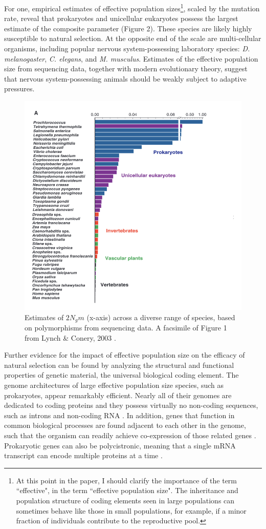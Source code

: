 \documentclass{article}
\begin{document}
For one, empirical estimates of effective population sizes\footnote{At this point in the paper, I should clarify the importance of the term ``effective", in the term ``effective population size". The inheritance and population structure of coding elements seen in large populations can sometimes behave like those in small populations, for example, if a minor fraction of individuals contribute to the reproductive pool.}, scaled by the mutation rate, reveal that prokaryotes and unicellular eukaryotes possess the largest estimate of the composite parameter (Figure 2). These species are likely highly susceptible to natural selection. At the opposite end of the scale are multi-cellular organisms, including popular nervous system-possessing laboratory species: \textit{D. melanogaster}, \textit{C. elegans}, and \textit{M. musculus}. Estimates of the effective population size from sequencing data, together with modern evolutionary theory, suggest that nervous system-possessing animals should be weakly subject to adaptive pressures. 

\begin{figure}[htp]
\centering
\includegraphics[width=10 cm]{fig_2.jpeg}
\caption{Estimates of $2N_g m$ (x-axis) across a diverse range of species, based on polymorphisms from sequencing data. A facsimile of Figure 1 from Lynch \& Conery, 2003 \cite{Lynch_Conery_2003}.}
\end{figure}

Further evidence for the impact of effective population size on the efficacy of natural selection can be found by analyzing the structural and functional properties of genetic material, the universal biological coding element. The genome architectures of large effective population size species, such as prokaryotes, appear remarkably efficient. Nearly all of their genomes are dedicated to coding proteins and they possess virtually no non-coding sequences, such as introns and non-coding RNA \cite{lynch2007origins, milo2016cell}. In addition, genes that function in common biological processes are found adjacent to each other in the genome, such that the organism can readily achieve co-expression of those related genes \cite{overbeek_matlsev_1999}. Prokaryotic genes can also be polycistronic, meaning that a single mRNA transcript can encode multiple proteins at a time \cite{kozak_1999}. 
\end{document}
